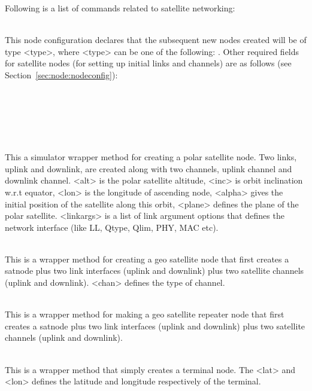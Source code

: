 Following is a list of commands related to satellite networking:
\begin{flushleft}
\\
This node configuration declares that the subsequent new nodes created
will be of type <type>, where <type> can be one of the following:
.  Other required fields for
satellite nodes (for setting up initial links and channels) are as follows 
(see Section~\ref{sec:node:nodeconfig}):
\\
\\
\\
\\
\\
\\

\\
This a simulator wrapper method for creating a polar satellite node. Two
links, uplink and downlink, are created along with two channels, uplink
channel and downlink channel. <alt> is the polar satellite altitude,
<inc> is orbit inclination w.r.t equator, <lon> is the longitude of 
ascending node, <alpha>
gives the initial position of the satellite along this orbit, <plane> 
defines the plane of
the polar satellite. <linkargs> is a list of link argument options that
defines the network interface (like LL, Qtype, Qlim, PHY, MAC etc).


\\
This is a wrapper method for creating a geo satellite node that first
creates a satnode plus two link interfaces (uplink and downlink) plus two 
satellite channels (uplink and downlink). <chan> defines the type of
channel.


\\
This is a wrapper method for making a geo satellite repeater node that 
first creates a satnode plus two link interfaces (uplink and downlink)
plus two satellite channels (uplink and downlink). 


\\
This is a wrapper method that simply creates a terminal node. The <lat>
and <lon> defines the latitude and longitude respectively of the terminal.



\end{flushleft}

